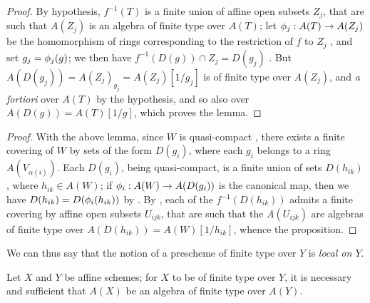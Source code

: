 \begin{proof}
\label{proof-1.6.3.2.1}
By hypothesis, $f^{-1}(T)$ is a finite union of affine open subsets $Z_j$, that are such that $A(Z_j)$ is an algebra of finite type over $A(T)$;
let $\phi_j:A(T)\to A(Z_j)$ be the homomorphism of rings corresponding to the restriction of $f$ to $Z_j$ , and set $g_j=\phi_j(g)$;
we then have $f^{-1}(D(g))\cap Z_j=D(g_j)$ .
But $A(D(g_j))=A(Z_j)_{g_j}=A(Z_j)[1/g_j]$ is of finite type over $A(Z_j)$, and \emph{a fortiori} over $A(T)$ by the hypothesis, and so also over $A(D(g))=A(T)[1/g]$, which proves the lemma.
\end{proof}

\begin{proof}
\label{proof-1.6.3.2}
With the above lemma, since $W$ is quasi-compact , there exists a finite covering of $W$ by sets of the form $D(g_i)$, where each $g_i$ belongs to a ring $A(V_{\alpha(i)})$.
Each $D(g_i)$, being quasi-compact, is a finite union of sets $D(h_{ik})$, where $h_{ik}\in A(W)$;
if $\phi_i:A(W)\to A(D(g_i))$ is the canonical map, then we have $D(h_{ik})=D(\phi_i(h_{ik}))$ by .
By , each of the $f^{-1}(D(h_{ik}))$ admits a finite covering by affine open subsets $U_{ijk}$, that are such that the $A(U_{ijk})$ are algebras of finite type over $A(D(h_{ik}))=A(W)[1/h_{ik}]$, whence the proposition.
\end{proof}

We can thus say that the notion of a prescheme of finite type over $Y$ is \emph{local on $Y$}.

\begin{prop}[6.3.3]
\label{1.6.3.3}
Let $X$ and $Y$ be affine schemes;
for $X$ to be of finite type over $Y$, it is necessary and sufficient that $A(X)$ be an algebra of finite type over $A(Y)$.
\end{prop}

